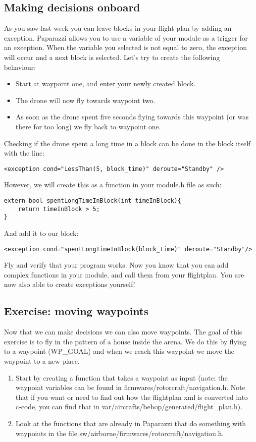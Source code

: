 \documentclass{article}
\begin{document}
\subsection*{Making decisions onboard}
As you saw last week you can leave blocks in your flight plan by adding an exception. Paparazzi allows you to use a variable of your module as a trigger for an exception. When the variable you selected is not equal to zero, the exception will occur and a next block is selected. 
Let's try to create the following behaviour: 
\begin{itemize}
\item Start at waypoint one, and enter your newly created block. 
\item The drone will now fly towards waypoint two. 
\item As soon as the drone spent five seconds flying towards this waypoint (or was there for too long) we fly back to waypoint one. 
\end{itemize}
Checking if the drone spent a long time in a block can be done in the block itself with the line:
\begin{verbatim}
<exception cond="LessThan(5, block_time)" deroute="Standby" /> 
\end{verbatim}
However, we will create this as a function in your module.h file as such:
\begin{verbatim}
extern bool spentLongTimeInBlock(int timeInBlock){
	return timeInBlock > 5;
}
\end{verbatim}
And add it to our block:
\begin{verbatim}
<exception cond="spentLongTimeInBlock(block_time)" deroute="Standby"/>
\end{verbatim}
Fly and verify that your program works. Now you know that you can add complex functions in your module, and call them from your flightplan. 
You are now also able to create exceptions yourself!

\subsection*{Exercise: moving waypoints}
Now that we can make decisions we can also move waypoints. The goal of this exercise is to fly in the pattern of a house inside the arena. 
We do this by flying to a waypoint (WP\_GOAL) and when we reach this waypoint we move the waypoint to a new place. 

\begin{enumerate}
\item Start by creating a function that takes a waypoint as input (note: the waypoint variables can be found in firmwares/rotorcraft/navigation.h. Note that if you want or need to find out how the flightplan xml is converted into c-code, you can find that in var/aircrafts/bebop/generated/flight\_plan.h).
\item Look at the functions that are already in Paparazzi that do something with waypoints in the file sw/airborne/firmwares/rotorcraft/navigation.h. 
\end{enumerate}
\end{document}

